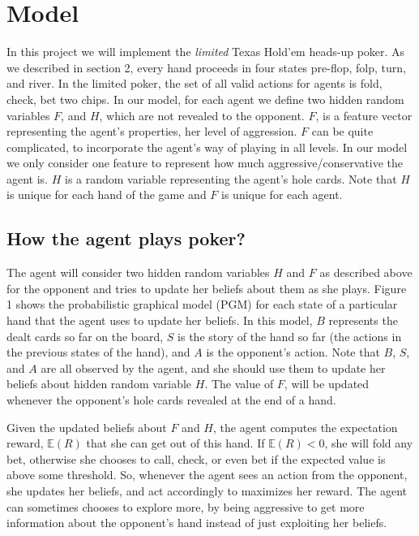 \section{Model}
In this project we will implement the \emph{limited} Texas Hold'em heads-up poker. As we
described in section 2, every hand proceeds in four states pre-flop, folp, 
turn, and river. In the limited poker, the set of all valid actions 
for agents is fold, check, bet two chips. In our model, for each agent
we define two hidden random variables $F$, and $H$, which are not revealed to the
opponent. $F$, is a feature vector representing the agent's properties, \ie her 
level of aggression. $F$ can be quite complicated, to incorporate the 
agent's way of playing in all levels. In our model we only consider one feature 
to represent how much aggressive/conservative the agent is. $H$ is a random
variable representing the agent's hole cards. Note that $H$ is unique for 
each hand of the game and $F$ is unique for each agent.

\subsection{How the agent plays poker?}
The agent will consider two hidden random variables $H$ and $F$ as described above 
for the opponent and tries to update her beliefs about them as she plays. Figure 1 shows the
probabilistic graphical model (PGM) for each state of a 
particular hand that the agent uses to update her 
beliefs. In this model, $B$ represents the dealt cards so far on the board, $S$ is the 
story of the hand so far (\ie the actions in the previous states of the hand), and 
$A$ is the opponent's action. Note that $B$, $S$, and $A$ are all observed by the
agent, and she should use them to update her beliefs about hidden random variable
$H$. The value of $F$, will be updated whenever the opponent's hole cards revealed
at the end of a hand. 

Given the updated beliefs about $F$ and $H$, the agent computes the expectation reward, 
$\mathbb{E}(R)$ that she can get out of this hand. If $\mathbb{E}(R) <0$, she will
fold any bet, otherwise she chooses to call, check, or even bet if the expected value 
is above some threshold. So, whenever the agent sees an action from the opponent, she
updates her beliefs, and act accordingly to maximizes her reward. The agent can sometimes
chooses to explore more, by being aggressive to get more information about the 
opponent's hand instead of just exploiting her beliefs. 
 
